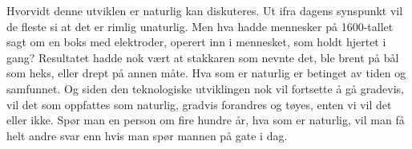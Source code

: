 Hvorvidt denne utviklen er naturlig kan diskuteres. Ut ifra dagens synspunkt vil de fleste si at det er rimlig unaturlig. Men hva hadde mennesker på 1600-tallet sagt om en boks med elektroder, operert inn i mennesket, som holdt hjertet i gang? Resultatet hadde nok vært at stakkaren som nevnte det, ble brent på bål som heks, eller drept på annen måte.
Hva som er naturlig er betinget av tiden og samfunnet. Og siden den teknologiske utviklingen nok vil fortsette å gå gradevis, vil det som oppfattes som naturlig, gradvis forandres og tøyes, enten vi vil det eller ikke. Spør man en person om fire hundre år, hva som er naturlig, vil man få helt andre svar enn hvis man spør mannen på gate i dag.